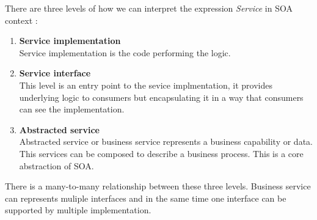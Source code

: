 There are three levels of how we can interpret the expression \emph{Service} in SOA context \cite{agile-architecture}:
\begin{enumerate}
  \item \textbf{Service implementation} \hfill \\
Service implementation is the code performing the logic.
  \item \textbf{Service interface} \hfill \\ 
This level is an entry point to the sevice implmentation, it provides underlying logic to consumers but encapsulating it in a way that consumers can see the implementation. 
  \item \textbf{Abstracted service} \hfill \\
Abstracted service or business service represents a business capability or data. This services can be composed to describe a business process. This is a core abstraction of SOA.
\end{enumerate}

There is a many-to-many relationship between these three levels. Business service can represents muliple interfaces and in the same time one interface can be supported by multiple implementation.




\bigskip


